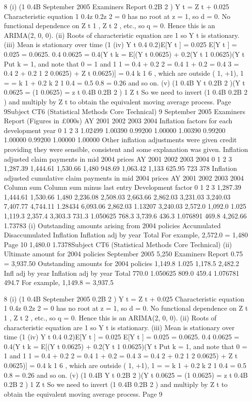 \documentclass[a4paper,12pt]{article}
\begin{document}
8
(i)
(1
0.4B
September 2005
Examiners Report
0.2B 2 ) Y t = Z t + 0.025
Characteristic equation
1
0.4z
0.2z 2 = 0
has no root at z = 1, so d = 0.
No functional dependence on Z t 1 , Z t 2 , etc., so q = 0.
Hence this is an ARIMA(2, 0, 0).
(ii) Roots of characteristic equation are 1
so {Y t } is stationary.
(iii) Mean is stationary over time
(1
(iv)
Y t
0.4 0.2)E[Y t ] = 0.025
E[Y t ] = 0.025
= 0.0625.
0.4
0.0625 = 0.4(Y t
k
= E[(Y t
0.0625) + 0.2(Y t
1
0.0625)(Y t
Put k = 1, and note that
0 = 1 and
1 1
= 0.4 + 0.2
2 = 0.4 1 + 0.2 = 0.4
3 = 0.4 2 + 0.2
1
2
0.0625) + Z t
0.0625)] = 0.4
k
1
6 , which are outside ( 1, +1),
1
=
=
k 1
+ 0.2
k 2
1
0.4
= 0.5
0.8
= 0.26
and so on.
(v)
(1
0.4B
Y t
0.2B 2 )(Y t
0.0625 = (1
0.0625) = z t
0.4B
0.2B 2 ) 1 Z t
So we need to invert (1 0.4B 0.2B 2 )
and multiply by Z t to obtain the equivalent moving average process.
Page 9Subject CT6 (Statistical Methods Core Technical)
9
September 2005
Examiners Report
(Figures in £000s)
AY
2001
2002
2003
2004
Inflation factors for each development year
0
1
2
3
1.02499
1.00390
0.99200
1.00000
1.00390
0.99200
1.00000
0.99200
1.00000
1.00000
Other inflation adjustments were given credit providing they were sensible, consistent and
some explanation was given.
Inflation adjusted claim payments in mid 2004
prices
AY
2001
2002
2003
2004
0 1 2 3
1,287.39
1,444.61
1,530.66
1,480 948.69
1,063.42
1,133 625.95
723 378
Inflation adjusted cumulative claim payments in
mid 2004 prices
AY
2001
2002
2003
2004
Column sum
Column sum minus last entry
Development factor
0 1 2 3
1,287.39
1,444.61
1,530.66
1,480 2,236.08
2,508.03
2,663.66 2,862.03
3,231.03 3,240.03
7,407.77
4,744.11
1.28434 6,093.06
2,862.03
1.13207 3,240.03
2,572.0
1,092.0
1.025
1,119.3
2,357.4 3,303.3
731.3
1.050625
768.3 3,739.6
436.3
1.076891
469.8
4,262.66
1.73783
(i)
Outstanding amounts arising from 2004 policies
Accumulated
Disaccumulated
Inflation
Inflation adj by year
Total
For example, 2,572.0 = 1,480
Page 10
1,480.0
1.7378Subject CT6 (Statistical Methods Core Technical)
(ii)
Ultimate amount for 2004 policies
September 2005
5,250
Examiners Report
0.75 = 3,937.50
Outstanding amounts for 2004 policies
1,149.8
1.025
1,178.5
2,482.2
Infl adj by year
Inflation adj by year
Total
770.0
1.050625
809.0
459.4
1.076781
494.7
For example,
1,149.8 = 3,937.5


8
(i)
(1
0.4B
September 2005
0.2B 2 ) Y t = Z t + 0.025
Characteristic equation
1
0.4z
0.2z 2 = 0
has no root at z = 1, so d = 0.
No functional dependence on Z t 1 , Z t 2 , etc., so q = 0.
Hence this is an ARIMA(2, 0, 0).
(ii) Roots of characteristic equation are 1
so {Y t } is stationary.
(iii) Mean is stationary over time
(1
(iv)
Y t
0.4 0.2)E[Y t ] = 0.025
E[Y t ] = 0.025
= 0.0625.
0.4
0.0625 = 0.4(Y t
k
= E[(Y t
0.0625) + 0.2(Y t
1
0.0625)(Y t
Put k = 1, and note that
0 = 1 and
1 1
= 0.4 + 0.2
2 = 0.4 1 + 0.2 = 0.4
3 = 0.4 2 + 0.2
1
2
0.0625) + Z t
0.0625)] = 0.4
k
1
6 , which are outside ( 1, +1),
1
=
=
k 1
+ 0.2
k 2
1
0.4
= 0.5
0.8
= 0.26
and so on.
(v)
(1
0.4B
Y t
0.2B 2 )(Y t
0.0625 = (1
0.0625) = z t
0.4B
0.2B 2 ) 1 Z t
So we need to invert (1 0.4B 0.2B 2 )
and multiply by Z t to obtain the equivalent moving average process.
Page 9%
\end{document}
